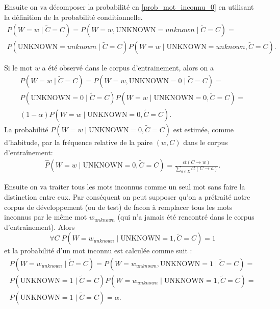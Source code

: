 \documentclass[12pt]{article}
\begin{document}
Ensuite on va d\'ecomposer la probabilit\'e en \ref{prob_mot_inconnu_0} en
utilisant la d\'efinition de la probabilit\'e conditionnelle.
\begin{multline}
\label{prob_mot_inconnu_cond}
 P(W = w \mid \tilde{C} = C) = P(W = w, \mathrm{UNKNOWN} = unknown \mid
 \tilde{C} = C) = \\ P(\mathrm{UNKNOWN} = unknown \mid \tilde{C} = C) P(W = w \mid \mathrm{UNKNOWN} = unknown , \tilde{C} = C).
\end{multline}

 Si le mot $w$ a \'et\'e observ\'e dans le corpus d'entrainement, alors on a
\begin{multline}
\label{prob_mot_connu_1}
 P(W = w \mid \tilde{C} = C) = P(W = w, \mathrm{UNKNOWN} = 0 \mid \tilde{C} = C)
 = \\ P(\mathrm{UNKNOWN} = 0 \mid \tilde{C} = C) P(W = w \mid \mathrm{UNKNOWN} =
 0, \tilde{C} = C) = \\ (1 - \alpha) P(W = w \mid \mathrm{UNKNOWN} = 0, \tilde{C} = C).
\end{multline}
La probabilit\'e $P(W = w \mid \mathrm{UNKNOWN} = 0, \tilde{C} = C)$ est estim\'ee,
comme d'habitude, par la fr\'equence relative de la paire $(w, C)$ dans le corpus
d'entra\^inement:
\begin{eqnarray*}
\hat{P}(W = w \mid \mathrm{UNKNOWN} = 0, \tilde{C} = C) =
\frac{ct(C \rightarrow w)}{\sum\limits_{a \in \Sigma}{ct(C \rightarrow a)}}.
\end{eqnarray*}

Ensuite on va traiter tous les mots inconnus comme un seul mot sans faire la
distinction entre eux.
Par cons\'equent on peut supposer qu'on a pr\'etrait\'e notre corpus de
d\'eveloppement (ou de test) de facon \`a remplacer tous les mots inconnus par le
m\^eme mot $w_{unknown}$ (qui n'a jamais \'et\'e rencontr\'e dans le corpus
d'entra\^inement). Alors $$\forall C \; P(W = w_{unknown} \mid \mathrm{UNKNOWN} =
1, \tilde{C} = C) = 1$$ et la probabilit\'e d'un mot inconnu est calcul\'ee comme
suit :
\begin{multline}
\label{prob_mot_inconnu_1}
 P(W = w_{unknown} \mid \tilde{C} = C) = P(W = w_{unknown}, \mathrm{UNKNOWN} = 1
 \mid \tilde{C} = C) = \\ P(\mathrm{UNKNOWN} = 1 \mid \tilde{C} = C) P(W =
 w_{unknown} \mid \mathrm{UNKNOWN} = 1, \tilde{C} = C) = \\ P(\mathrm{UNKNOWN} =
 1 \mid \tilde{C} = C) = \alpha.
\end{multline}
\end{document}
